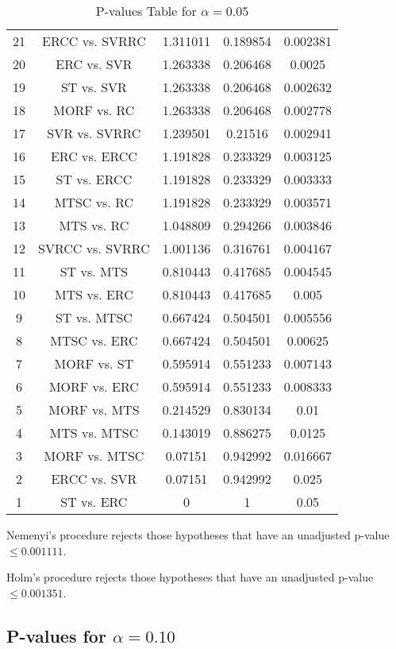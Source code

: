 \documentclass[a4paper,10pt]{article}
\begin{document}
\begin{landscape}
\begin{table}[!htp]
\begin{tabular}{ccccc}
21&ERCC vs. SVRRC&1.311011&0.189854&0.002381\\
20&ERC vs. SVR&1.263338&0.206468&0.0025\\
19&ST vs. SVR&1.263338&0.206468&0.002632\\
18&MORF vs. RC&1.263338&0.206468&0.002778\\
17&SVR vs. SVRRC&1.239501&0.21516&0.002941\\
16&ERC vs. ERCC&1.191828&0.233329&0.003125\\
15&ST vs. ERCC&1.191828&0.233329&0.003333\\
14&MTSC vs. RC&1.191828&0.233329&0.003571\\
13&MTS vs. RC&1.048809&0.294266&0.003846\\
12&SVRCC vs. SVRRC&1.001136&0.316761&0.004167\\
11&ST vs. MTS&0.810443&0.417685&0.004545\\
10&MTS vs. ERC&0.810443&0.417685&0.005\\
9&ST vs. MTSC&0.667424&0.504501&0.005556\\
8&MTSC vs. ERC&0.667424&0.504501&0.00625\\
7&MORF vs. ST&0.595914&0.551233&0.007143\\
6&MORF vs. ERC&0.595914&0.551233&0.008333\\
5&MORF vs. MTS&0.214529&0.830134&0.01\\
4&MTS vs. MTSC&0.143019&0.886275&0.0125\\
3&MORF vs. MTSC&0.07151&0.942992&0.016667\\
2&ERCC vs. SVR&0.07151&0.942992&0.025\\
1&ST vs. ERC&0&1&0.05\\
\hline
\end{tabular}
\caption{P-values Table for $\alpha=0.05$}
\end{table}Nemenyi's procedure rejects those hypotheses that have an unadjusted p-value $\le0.001111$.

Holm's procedure rejects those hypotheses that have an unadjusted p-value $\le0.001351$.

\pagebreak

\subsection{P-values for $\alpha=0.10$}


\end{landscape}
\end{document}
